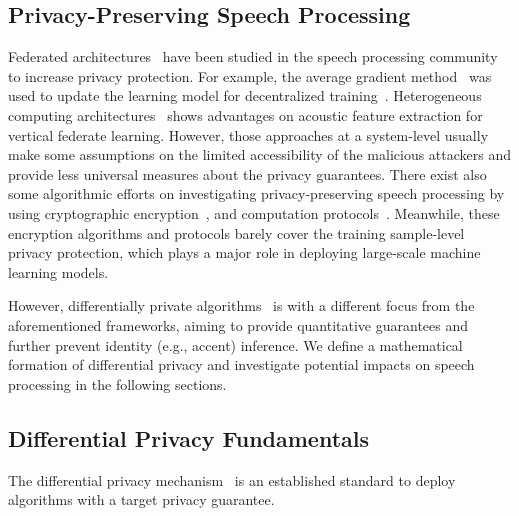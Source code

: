 \documentclass[a4paper]{article}
\begin{document}
\subsection{Privacy-Preserving Speech Processing}
Federated architectures~\cite{leroy2019federated,  dimitriadis2020federated, yang2020decentralizing} have been studied in the speech processing community to increase privacy protection. For example, the average gradient method~\cite{dimitriadis2020federated} was used to update the learning model for decentralized training~\cite{qi2020submodular}. Heterogeneous computing architectures~\cite{yang2020decentralizing, chen2021federated} shows advantages on acoustic feature extraction for vertical federate learning. However, those approaches at a system-level usually make some assumptions on the limited accessibility of the malicious attackers and provide less universal measures about the privacy guarantees. There exist also some algorithmic efforts on investigating privacy-preserving speech processing by using cryptographic encryption~\cite{glackin2017privacy, brasser2018voiceguard}, and computation protocols~\cite{pathak2012privacy}. Meanwhile, these encryption algorithms and protocols barely cover the training sample-level privacy protection, which plays a major role in deploying large-scale machine learning models.

However, differentially private algorithms~\cite{abadi2016deep, dwork2010boosting} is with a different focus from the aforementioned frameworks, aiming to provide quantitative guarantees and further prevent identity (e.g., accent) inference. We define a mathematical formation of differential privacy and investigate potential impacts on speech processing in the following sections.


\subsection{Differential Privacy Fundamentals}
The differential privacy mechanism~\cite{dwork2008differential} is an established standard to deploy algorithms with a target privacy guarantee.
\end{document}
